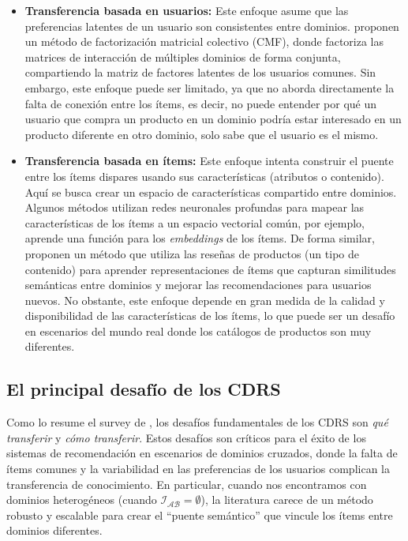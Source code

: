 		\begin{itemize}
			\item \textbf{Transferencia basada en usuarios:} Este enfoque asume que las preferencias latentes de un usuario son consistentes entre dominios. \cite{10.1145/1401890.1401969} proponen un método de factorización matricial colectivo (CMF), donde factoriza las matrices de interacción de múltiples dominios de forma conjunta, compartiendo la matriz de factores latentes de los usuarios comunes. Sin embargo, este enfoque puede ser limitado, ya que no aborda directamente la falta de conexión entre los ítems, es decir, no puede entender por qué un usuario que compra un producto en un dominio podría estar interesado en un producto diferente en otro dominio, solo sabe que el usuario es el mismo.

			\item \textbf{Transferencia basada en ítems:} Este enfoque intenta construir el puente entre los ítems dispares usando sus características (atributos o contenido). Aquí se busca crear un espacio de características compartido entre dominios. Algunos métodos utilizan redes neuronales profundas para mapear las características de los ítems a un espacio vectorial común, por ejemplo, \cite{man2017cross} aprende una función para los \textit{embeddings} de los ítems. De forma similar, \cite{9042271} proponen un método que utiliza las reseñas de productos (un tipo de contenido) para aprender representaciones de ítems que capturan similitudes semánticas entre dominios y mejorar las recomendaciones para usuarios nuevos. No obstante, este enfoque depende en gran medida de la calidad y disponibilidad de las características de los ítems, lo que puede ser un desafío en escenarios del mundo real donde los catálogos de productos son muy diferentes.
		\end{itemize}

	\subsection{El principal desafío de los CDRS}
		Como lo resume el survey de \cite{10.1145/3548455}, los desafíos fundamentales de los CDRS son \textit{qué transferir} y \textit{cómo transferir}. Estos desafíos son críticos para el éxito de los sistemas de recomendación en escenarios de dominios cruzados, donde la falta de ítems comunes y la variabilidad en las preferencias de los usuarios complican la transferencia de conocimiento. En particular, cuando nos encontramos con dominios heterogéneos (cuando $\mathcal{I_{AB}} = \emptyset$), la literatura carece de un método robusto y escalable para crear el \enquote{puente semántico} que vincule los ítems entre dominios diferentes.

